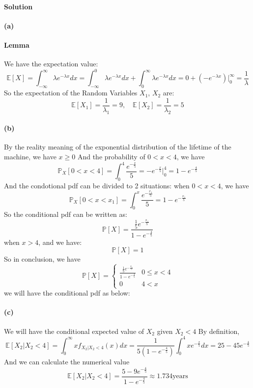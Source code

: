 \documentclass[a4paper,10pt]{article}
\begin{document}
\paragraph{Solution}
\paragraph{(a)}
\paragraph{Lemma}
We have the expectation value:
\[
\mathbb{E}[X] = \int_{-\infty}^{\infty} \lambda e^{-\lambda x}dx = \int_{-\infty}^{0} \lambda e^{-\lambda x}dx + \int_{0}^{\infty} \lambda e^{-\lambda x}dx = 0 + (-e^{-\lambda x})\bigg|_{0}^{\infty} = \frac{1}{\lambda}  
\]
So the expectation of the Random Variables \(X_1\), \(X_2\) are:
\[
\boxed{\mathbb{E}[X_1] = \frac{1}{\lambda_1} = 9, \quad \mathbb{E}[X_2] = \frac{1}{\lambda_2} = 5}
\]

\paragraph{(b)}
By the reality meaning of the exponential distribution of the lifetime of the machine, we have \(x \ge 0\)
And the probability of \(0< x < 4\), we have
\[
\mathbb{P}_X[0 < x < 4] = \int_{0}^{4} \frac{e^{-\frac{x}{5}}}{5} = -e^{-\frac{x}{5}}\bigg|_{0}^{4} = 1 - e^{-\frac{4}{5}}
\]
And the condotional pdf can be divided to 2 situations:
when \(0 < x < 4\), we have
\[
\mathbb{P}_X[0 < x < x_1] = \int_{0}^{x} \frac{e^{-\frac{x_1}{5}}}{5} = 1 - e^{-\frac{x_1}{5}}
\]
So the conditional pdf can be written as:
\[
\mathbb{P}[X] = \frac{\frac{1}{5}e^{-\frac{x_1}{5}}}{1 - e^{-\frac{4}{5}}}
\]
when \(x > 4\), and we have:
\[
\mathbb{P}[X] = 1
\]
So in conclusion, we have
\[
\mathbb{P}[X] = 
\begin{cases}
\frac{\frac{1}{5}e^{-\frac{x_1}{5}}}{1 - e^{-\frac{4}{5}}} & 0 \le x < 4 \\
0 & 4 < x
\end{cases}
\]
we will have the conditional pdf as below:
\paragraph{(c)}
We will have the conditional expected value of $X_2$ given \(X_2 < 4\) 
By definition,
\[
\mathbb{E}[X_2|X_2 < 4] = \int_{0}^{\infty}xf_{X_2|X_2 < 4}(x)dx = \frac{1}{5(1 - e^{-\frac{4}{5}})} \int_{0}^{4} xe^{-\frac{x}{5}}dx = 25 - 45e^{-\frac{4}{5}}
\]
And we can calculate the numerical value
\[
\boxed{\mathbb{E}[X_2|X_2 < 4] = \frac{5-9e^{-\frac{4}{5}}}{1-e^{-\frac{4}{5}}}} \approx 1.734 \text{years}\]
\end{document}
